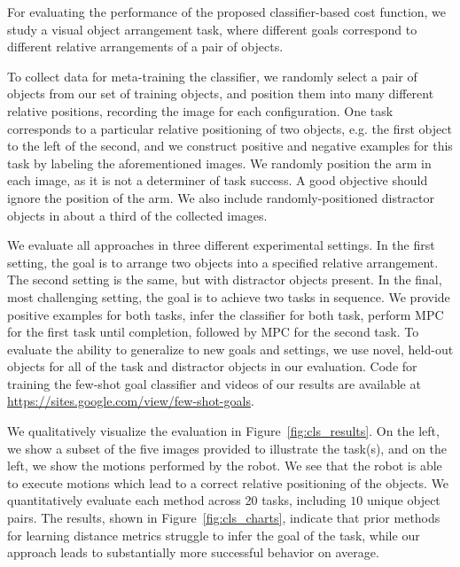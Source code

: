 For evaluating the performance of the proposed classifier-based cost function, we study a visual object arrangement task, where different goals correspond to different relative arrangements of a pair of objects. 


To collect data for meta-training the classifier, we randomly select a pair of objects from our set of training objects, and position them into many different relative positions, recording the image for each configuration. One task corresponds to a particular relative positioning of two objects, e.g. the first object to the left of the second, and we construct positive and negative examples for this task by labeling the aforementioned images. We randomly position the arm in each image, as it is not a determiner of task success. A good objective should ignore the position of the arm. We also include randomly-positioned distractor objects in about a third of the collected images.

We evaluate all approaches in three different experimental settings. In the first setting, the goal is to arrange two objects into a specified relative arrangement. The second setting is the same, but with distractor objects present. In the final, most challenging setting, the goal is to achieve two tasks in sequence. We provide positive examples for both tasks, infer the classifier for both task, perform MPC for the first task until completion, followed by MPC for the second task. To evaluate the ability to generalize to new goals and settings, we use novel, held-out objects for all of the task and distractor objects in our evaluation. Code for training the few-shot goal classifier and videos of our results are available at \url{https://sites.google.com/view/few-shot-goals}.

We qualitatively visualize the evaluation in Figure~\ref{fig:cls_results}. On the left, we show a subset of the five images provided to illustrate the task(s), and on the left, we show the motions performed by the robot. We see that the robot is able to execute motions which lead to a correct relative positioning of the objects.
We quantitatively evaluate each method across 20 tasks, including $10$ unique object pairs. The results, shown in Figure~\ref{fig:cls_charts}, indicate that prior methods for learning distance metrics
struggle to infer the goal of the task, while our approach leads to substantially more successful behavior on average. 


